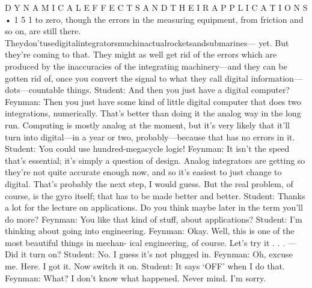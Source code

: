 \documentclass[10pt,oneside]{article}
\begin{document}
D Y N A M I C A L  E F F E C T S  A N D  T H E I R  A P P L I C A T I O N S • 1 5 1 to zero, though the errors in the measuring equipment, from friction and so on, are still there. Theydon’tusedigitalintegratorsmuchinactualrocketsandsubmarines--- yet. But they’re coming to that. They might as well get rid of the errors which are produced by the inaccuracies of the integrating machinery---and they can be gotten rid of, once you convert the signal to what they call digital information---dots---countable things. Student: And then you just have a digital computer? Feynman: Then you just have some kind of little digital computer that does two integrations, numerically. That’s better than doing it the analog way in the long run. Computing is mostly analog at the moment, but it’s very likely that it’ll turn into digital---in a year or two, probably---because that has no errors in it. Student: You could use hundred-megacycle logic! Feynman: It isn’t the speed that’s essential; it’s simply a question of design. Analog integrators are getting so they’re not quite accurate enough now, and so it’s easiest to just change to digital. That’s probably the next step, I would guess. But the real problem, of course, is the gyro itself; that has to be made better and better. Student: Thanks a lot for the lecture on applications. Do you think maybe later in the term you’ll do more? Feynman: You like that kind of stuff, about applications? Student: I’m thinking about going into engineering. Feynman: Okay. Well, this is one of the most beautiful things in mechan- ical engineering, of course. Let’s try it . . . ---Did it turn on? Student: No. I guess it’s not plugged in. Feynman: Oh, excuse me. Here. I got it. Now switch it on. Student: It says ‘OFF’ when I do that. Feynman: What? I don’t know what happened. Never mind. I’m sorry.\par
\end{document}

